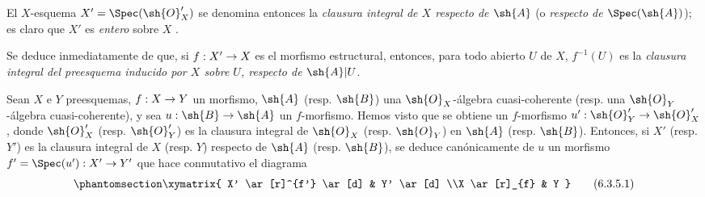 \documentclass[oneside,10pt]{amsart}
\makeatletter
\newcommand{\ega@arrow}[2]{\mathchoice{#1}{#2}{#2}{#2}}
\renewcommand{\to}{\ega@arrow{\longrightarrow}{\rightarrow}}
\let\EGAOriginalLabel\label
\renewcommand{\label}[1]{\phantomsection\EGAOriginalLabel{#1}}
\makeatother
\begin{document}
El $X$-esquema $X'=\Spec(\sh{O}'_X)$ se denomina entonces la \emph{clausura integral de $X$ respecto de $\sh{A}$} (o \emph{respecto de $\Spec(\sh{A})$});
es claro que $X'$ es \emph{entero} sobre $X$ .

Se deduce inmediatamente de  que, si $f:X'\to X$ es el morfismo estructural, entonces, para todo abierto $U$ de $X$, $f^{-1}(U)$ es la \emph{clausura integral del preesquema inducido por $X$ sobre $U$, respecto de $\sh{A}|U$}.

\begin{env}[6.3.5]
\label{II.6.3.5}
Sean $X$ e $Y$ preesquemas, $f:X\to Y$ un morfismo, $\sh{A}$ (resp. $\sh{B}$) una $\sh{O}_X$-álgebra cuasi-coherente (resp. una $\sh{O}_Y$-álgebra cuasi-coherente), y sea $u:\sh{B}\to\sh{A}$ un $f$-morfismo.
Hemos visto  que se obtiene un $f$-morfismo $u':\sh{O}'_Y\to\sh{O}'_X$, donde $\sh{O}'_X$ (resp. $\sh{O}'_Y$) es la clausura integral de $\sh{O}_X$ (resp. $\sh{O}_Y$) en $\sh{A}$ (resp. $\sh{B}$).
Entonces, si $X'$ (resp. $Y'$) es la clausura integral de $X$ (resp. $Y$) respecto de $\sh{A}$ (resp. $\sh{B}$), se deduce canónicamente de $u$ un morfismo $f'=\Spec(u'):X'\to Y'$  que hace conmutativo el diagrama
\[
\label{II.6.3.5.1}
  \xymatrix{
    X' \ar[r]^{f'} \ar[d]
    & Y' \ar[d]
  \\X \ar[r]_{f}
    & Y
  }
\tag{6.3.5.1}
\]
\end{env}
\end{document}
